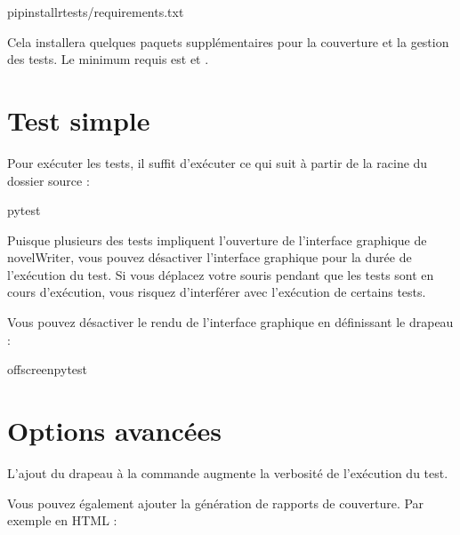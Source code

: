 \documentclass[a4paper,11pt,french]{sphinxmanual}
\begin{document}
\begin{sphinxVerbatim}[commandchars=\\\{\}]
pipinstall\PYGZhy{}rtests/requirements.txt
\end{sphinxVerbatim}

\sphinxAtStartPar
Cela installera quelques paquets supplémentaires pour la couverture et la gestion des tests. Le minimum requis est  et .


\section{Test simple}
\label{\detokenize{tech_tests:simple-test-run}}
\sphinxAtStartPar
Pour exécuter les tests, il suffit d’exécuter ce qui suit à partir de la racine du dossier source :

\begin{sphinxVerbatim}[commandchars=\\\{\}]
pytest
\end{sphinxVerbatim}

\sphinxAtStartPar
Puisque plusieurs des tests impliquent l’ouverture de l’interface graphique de novelWriter, vous pouvez désactiver l’interface graphique pour la durée de l’exécution du test. Si vous déplacez votre souris pendant que les tests sont en cours d’exécution, vous risquez d’interférer avec l’exécution de certains tests.

\sphinxAtStartPar
Vous pouvez désactiver le rendu de l’interface graphique en définissant le drapeau  :

\begin{sphinxVerbatim}[commandchars=\\\{\}]
offscreenpytest
\end{sphinxVerbatim}


\section{Options avancées}
\label{\detokenize{tech_tests:advanced-options}}
\sphinxAtStartPar
L’ajout du drapeau  à la commande  augmente la verbosité de l’exécution du test.

\sphinxAtStartPar
Vous pouvez également ajouter la génération de rapports de couverture. Par exemple en HTML :
\end{document}
